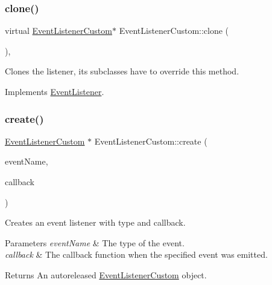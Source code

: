 \mbox{\label{classEventListenerCustom_a2b1c47443d2288b0b4a5b53fe35914ba}} 
\subsubsection{\texorpdfstring{clone()}{clone()}\hspace{0.1cm}{\footnotesize\ttfamily [2/2]}}
{\footnotesize\ttfamily virtual \hyperlink{classEventListenerCustom}{Event\+Listener\+Custom}$\ast$ Event\+Listener\+Custom\+::clone (\begin{DoxyParamCaption}{ }\end{DoxyParamCaption})\hspace{0.3cm}{\ttfamily [override]}, {\ttfamily [virtual]}}

Clones the listener, its subclasses have to override this method. 

Implements \hyperlink{classEventListener_a8707b41e85031f08e48def3584d51bc0}{Event\+Listener}.

\mbox{\label{classEventListenerCustom_a9c87b50cc58d3050eea1dd4ae564f430}} 
\subsubsection{\texorpdfstring{create()}{create()}\hspace{0.1cm}{\footnotesize\ttfamily [1/2]}}
{\footnotesize\ttfamily \hyperlink{classEventListenerCustom}{Event\+Listener\+Custom} $\ast$ Event\+Listener\+Custom\+::create (\begin{DoxyParamCaption}\item[{const std\+::string \&}]{event\+Name,  }\item[{const std\+::function$<$ void(\hyperlink{classEventCustom}{Event\+Custom} $\ast$)$>$ \&}]{callback }\end{DoxyParamCaption})\hspace{0.3cm}{\ttfamily [static]}}

Creates an event listener with type and callback. 
\begin{DoxyParams}{Parameters}
{\em event\+Name} & The type of the event. \\
\hline
{\em callback} & The callback function when the specified event was emitted. \\
\hline
\end{DoxyParams}
\begin{DoxyReturn}{Returns}
An autoreleased \hyperlink{classEventListenerCustom}{Event\+Listener\+Custom} object. 
\end{DoxyReturn}
\mbox{\label{classEventListenerCustom_a247e78165db8f43694df2e8871718e3f}} 
